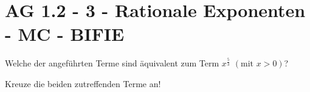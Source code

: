 \section{AG 1.2 - 3 - Rationale Exponenten - MC - BIFIE}

\begin{beispiel}[AG 1.2]{1} %
		Welche der angeführten Terme sind äquivalent zum Term $x^{\frac{5}{3}}$ $\left( \text{mit } x>0 \right)$?
			
			Kreuze die beiden zutreffenden Terme an!
\end{beispiel}


